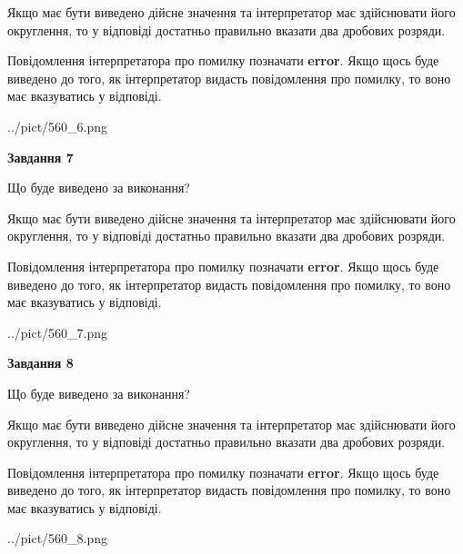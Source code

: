 \documentclass[12pt, ukrainian]{article}
\begin{document}
{\begin {Large}
Якщо має бути виведено дійсне значення та інтерпретатор має здійснювати його округлення, 
то у відповіді достатньо правильно вказати два дробових розряди.

Повідомлення інтерпретатора про помилку позначати \textbf{error}.
Якщо щось буде виведено до того, як інтерпретатор видасть повідомлення про помилку, 
то воно має вказуватись у відповіді. \par

\begin{center}
	{../pict/560_6.png}
\end{center}
\newpage

{\begin {center}\textbf{Завдання 7}\end {center}}\par
Що буде виведено за виконання? \par

Якщо має бути виведено дійсне значення та інтерпретатор має здійснювати його округлення, 
то у відповіді достатньо правильно вказати два дробових розряди.

Повідомлення інтерпретатора про помилку позначати \textbf{error}.
Якщо щось буде виведено до того, як інтерпретатор видасть повідомлення про помилку, 
то воно має вказуватись у відповіді. \par

\begin{center}
	{../pict/560_7.png}
\end{center}
\newpage

{\begin {center}\textbf{Завдання 8}\end {center}}\par
Що буде виведено за виконання? \par

Якщо має бути виведено дійсне значення та інтерпретатор має здійснювати його округлення, 
то у відповіді достатньо правильно вказати два дробових розряди.

Повідомлення інтерпретатора про помилку позначати \textbf{error}.
Якщо щось буде виведено до того, як інтерпретатор видасть повідомлення про помилку, 
то воно має вказуватись у відповіді. \par

\begin{center}
	{../pict/560_8.png}
\end{center}
\newpage


\end{Large}}
\end{document}
